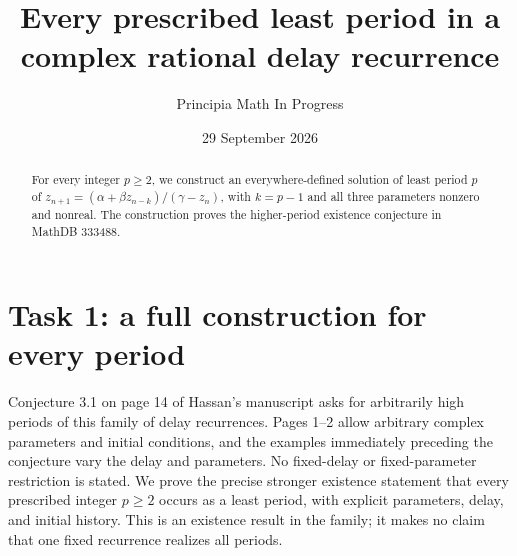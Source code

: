 \documentclass[11pt]{article}
\title{Every prescribed least period in a complex rational delay recurrence}
\author{Principia Math In Progress}
\date{29 September 2026}
\begin{document}
\maketitle
\begin{abstract}
For every integer $p\ge2$, we construct an everywhere-defined solution of
least period $p$ of $z_{n+1}=(\alpha+\beta z_{n-k})/(\gamma-z_n)$, with
$k=p-1$ and all three parameters nonzero and nonreal. The construction
proves the higher-period existence conjecture in MathDB 333488.
\end{abstract}

\section*{Task 1: a full construction for every period}
Conjecture 3.1 on page 14 of Hassan's manuscript \cite{Hassan} asks for
arbitrarily high periods of this family of delay recurrences. Pages 1--2
allow arbitrary complex parameters and initial conditions, and the
examples immediately preceding the conjecture vary the delay and
parameters. No fixed-delay or fixed-parameter restriction is stated.
We prove the precise stronger existence statement that every prescribed
integer $p\ge2$ occurs as a least period, with explicit parameters,
delay, and initial history. This is an existence result in the family;
it makes no claim that one fixed recurrence realizes all periods.
\end{document}
